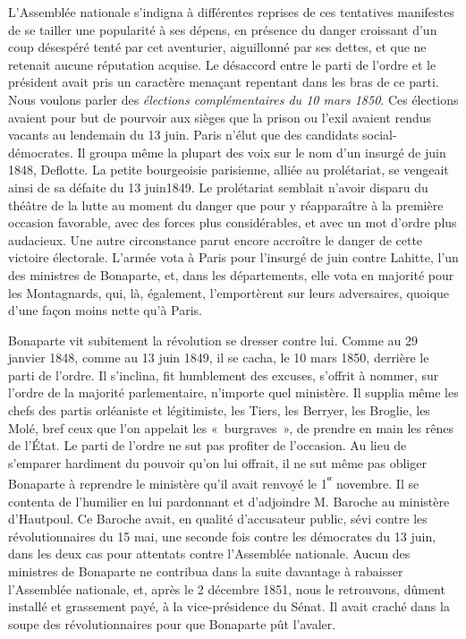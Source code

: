 \documentclass[french,twoside]{book} %
\begin{document}
L’Assemblée nationale s’indigna à différentes reprises de ces tentatives manifestes de se tailler une popularité à ses dépens, en présence du danger croissant d’un coup désespéré tenté par cet aventurier, aiguillonné par ses dettes, et que ne retenait aucune réputation acquise. Le désaccord entre le parti de l’ordre et le président avait pris un caractère menaçant repentant dans les bras de ce parti. Nous voulons parler des \emph{élections complémentaires du 10 mars 1850}. Ces élections avaient pour but de pourvoir aux sièges que la prison ou l’exil avaient rendus vacants au lendemain du 13 juin. Paris n’élut que des candidats social-démocrates. Il groupa même la plupart des voix sur le nom d’un insurgé de juin 1848, Deflotte. La petite bourgeoisie parisienne, alliée au prolétariat, se vengeait ainsi de sa défaite du 13 juin1849. Le prolétariat semblait n’avoir disparu du théâtre de la lutte au moment du danger que pour y réapparaître à la première occasion favorable, avec des forces plus considérables, et avec un mot d’ordre plus audacieux. Une autre circonstance parut encore accroître le danger de cette victoire électorale. L’armée vota à Paris pour l’insurgé de juin contre Lahitte, l’un des ministres de Bonaparte, et, dans les départements, elle vota en majorité pour les Montagnards, qui, là, également, l’emportèrent sur leurs adversaires, quoique d’une façon moins nette qu’à Paris.\par
Bonaparte vit subitement la révolution se dresser contre lui. Comme au 29 janvier 1848, comme au 13 juin 1849, il se cacha, le 10 mars 1850, derrière le parti de l’ordre. Il s’inclina, fit humblement des excuses, s’offrit à nommer, sur l’ordre de la majorité parlementaire, n’importe quel ministère. Il supplia même les chefs des partis orléaniste et légitimiste, les Tiers, les Berryer, les Broglie, les Molé, bref ceux que l’on appelait les « burgraves », de prendre en main les rênes de l’État. Le parti de l’ordre ne sut pas profiter de l’occasion. Au lieu de s’emparer hardiment du pouvoir qu’on lui offrait, il ne sut même pas obliger Bonaparte à reprendre le ministère qu’il avait renvoyé le 1\textsuperscript{ᵉʳ} novembre. Il se contenta de l’humilier en lui pardonnant et d’adjoindre M. Baroche au ministère d’Hautpoul. Ce Baroche avait, en qualité d’accusateur public, sévi contre les révolutionnaires du 15 mai, une seconde fois contre les démocrates du 13 juin, dans les deux cas pour attentats contre l’Assemblée nationale. Aucun des ministres de Bonaparte ne contribua dans la suite davantage à rabaisser l’Assemblée nationale, et, après le 2 décembre 1851, nous le retrouvons, dûment installé et grassement payé, à la vice-présidence du Sénat. Il avait craché dans la soupe des révolutionnaires pour que Bonaparte pût l’avaler.\par
\end{document}

